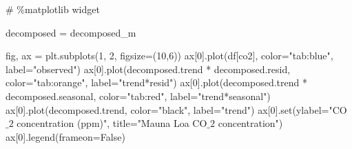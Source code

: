 \documentclass[
  letterpaper,
  DIV=11,
  numbers=noendperiod,
  oneside]{scrreprt}
\newenvironment{Shaded}{\begin{snugshade}}{\end{snugshade}}
\newcommand{\BuiltInTok}[1]{\textcolor[rgb]{0.00,0.23,0.31}{#1}}
\newcommand{\CommentTok}[1]{\textcolor[rgb]{0.37,0.37,0.37}{#1}}
\newcommand{\DecValTok}[1]{\textcolor[rgb]{0.68,0.00,0.00}{#1}}
\newcommand{\NormalTok}[1]{\textcolor[rgb]{0.00,0.23,0.31}{#1}}
\newcommand{\OperatorTok}[1]{\textcolor[rgb]{0.37,0.37,0.37}{#1}}
\newcommand{\StringTok}[1]{\textcolor[rgb]{0.13,0.47,0.30}{#1}}
\newcommand{\VariableTok}[1]{\textcolor[rgb]{0.07,0.07,0.07}{#1}}
\begin{document}
\begin{Shaded}
\begin{Highlighting}[]
\CommentTok{\# \%matplotlib widget}

\NormalTok{decomposed }\OperatorTok{=}\NormalTok{ decomposed\_m}

\NormalTok{fig, ax }\OperatorTok{=}\NormalTok{ plt.subplots(}\DecValTok{1}\NormalTok{, }\DecValTok{2}\NormalTok{, figsize}\OperatorTok{=}\NormalTok{(}\DecValTok{10}\NormalTok{,}\DecValTok{6}\NormalTok{))}
\NormalTok{ax[}\DecValTok{0}\NormalTok{].plot(df[}\StringTok{\textquotesingle{}co2\textquotesingle{}}\NormalTok{], color}\OperatorTok{=}\StringTok{"tab:blue"}\NormalTok{, label}\OperatorTok{=}\StringTok{"observed"}\NormalTok{)}
\NormalTok{ax[}\DecValTok{0}\NormalTok{].plot(decomposed.trend }\OperatorTok{*}\NormalTok{ decomposed.resid, color}\OperatorTok{=}\StringTok{"tab:orange"}\NormalTok{, label}\OperatorTok{=}\StringTok{"trend*resid"}\NormalTok{)}
\NormalTok{ax[}\DecValTok{0}\NormalTok{].plot(decomposed.trend }\OperatorTok{*}\NormalTok{ decomposed.seasonal, color}\OperatorTok{=}\StringTok{"tab:red"}\NormalTok{, label}\OperatorTok{=}\StringTok{"trend*seasonal"}\NormalTok{)}
\NormalTok{ax[}\DecValTok{0}\NormalTok{].plot(decomposed.trend, color}\OperatorTok{=}\StringTok{"black"}\NormalTok{, label}\OperatorTok{=}\StringTok{"trend"}\NormalTok{)}
\NormalTok{ax[}\DecValTok{0}\NormalTok{].}\BuiltInTok{set}\NormalTok{(ylabel}\OperatorTok{=}\StringTok{"CO$\_2$ concentration (ppm)"}\NormalTok{,}
\NormalTok{          title}\OperatorTok{=}\StringTok{"Mauna Loa CO$\_2$ concentration"}\NormalTok{)}
\NormalTok{ax[}\DecValTok{0}\NormalTok{].legend(frameon}\OperatorTok{=}\VariableTok{False}\NormalTok{)}


\end{Highlighting}
\end{Shaded}
\end{document}
